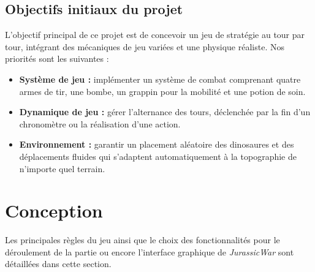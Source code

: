 \documentclass[11pt,a4paper]{article}
\begin{document}
\subsection{Objectifs initiaux du projet}
L'objectif principal de ce projet est de concevoir un jeu de stratégie au tour par tour, intégrant des mécaniques de jeu variées et une physique réaliste. Nos priorités sont les suivantes :

\begin{itemize}
    \item \textbf{Système de jeu :} implémenter un système de combat comprenant quatre armes de tir, une bombe, un grappin pour la mobilité et une potion de soin.
    \item \textbf{Dynamique de jeu :} gérer l'alternance des tours, déclenchée par la fin d'un chronomètre ou la réalisation d'une action.
    \item \textbf{Environnement :} garantir un placement aléatoire des dinosaures et des déplacements fluides qui s'adaptent automatiquement à la topographie de n'importe quel terrain.
\end{itemize}

\newpage
\section{Conception}
Les principales règles du jeu ainsi que le choix des fonctionnalités pour le déroulement de la partie ou encore l'interface graphique de \textit{JurassicWar} sont détaillées dans cette section. 
\end{document}
